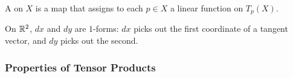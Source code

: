 \documentclass[../master/master.tex]{subfiles}
\begin{document}
\begin{definition}
A  on $X$ is a map that assigns to each $p \in X$ a linear function on $T_p(X)$.
\end{definition}

\begin{example}
On $\mathbb{R}^2$, $dx$ and $dy$ are $1$-forms: $dx$ picks out the first coordinate of a tangent vector, and $dy$ picks out the second.
\end{example}

\subsubsection*{Properties of Tensor Products}
\end{document}
